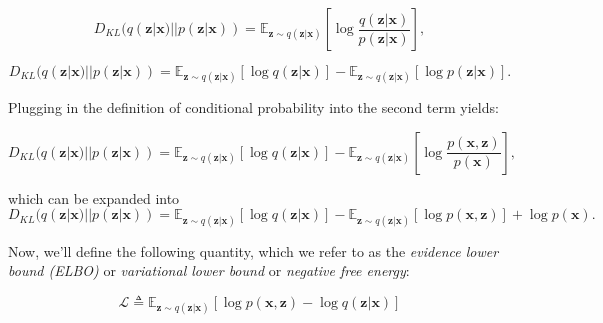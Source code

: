  \begin{equation}
 	D_{KL}(q (\mathbf{z} | \mathbf{x}) || p (\mathbf{z} | \mathbf{x})) = \mathbb{E}_{\mathbf{z} \sim q (\mathbf{z} | \mathbf{x})} \left[ \log \frac{q (\mathbf{z} | \mathbf{x})}{p (\mathbf{z} | \mathbf{x})} \right],
	\label{eq: elbo derivation 1}
 \end{equation}
 
 
 \begin{equation}
 	D_{KL}(q (\mathbf{z} | \mathbf{x}) || p (\mathbf{z} | \mathbf{x})) = \mathbb{E}_{\mathbf{z} \sim q (\mathbf{z} | \mathbf{x})} \left[ \log q (\mathbf{z} | \mathbf{x}) \right] - \mathbb{E}_{\mathbf{z} \sim q (\mathbf{z} | \mathbf{x})} \left[ \log p (\mathbf{z} | \mathbf{x}) \right].
	\label{eq: elbo derivation 2}
 \end{equation}
 
 \noindent Plugging in the definition of conditional probability into the second term yields:
 
  \begin{equation}
 	D_{KL}(q (\mathbf{z} | \mathbf{x}) || p (\mathbf{z} | \mathbf{x})) = \mathbb{E}_{\mathbf{z} \sim q (\mathbf{z} | \mathbf{x})} \left[ \log q (\mathbf{z} | \mathbf{x}) \right] - \mathbb{E}_{\mathbf{z} \sim q (\mathbf{z} | \mathbf{x})} \left[ \log \frac{p (\mathbf{x}, \mathbf{z})}{p (\mathbf{x})} \right],
	\label{eq: elbo derivation 3}
 \end{equation}
 
 \noindent which can be expanded into
 \begin{equation}
 	D_{KL}(q (\mathbf{z} | \mathbf{x}) || p (\mathbf{z} | \mathbf{x})) = \mathbb{E}_{\mathbf{z} \sim q (\mathbf{z} | \mathbf{x})} \left[ \log q (\mathbf{z} | \mathbf{x}) \right] - \mathbb{E}_{\mathbf{z} \sim q (\mathbf{z} | \mathbf{x})} \left[ \log p (\mathbf{x}, \mathbf{z}) \right] + \log p (\mathbf{x}).
	\label{eq: elbo derivation 4}
 \end{equation}
 
 \noindent Now, we'll define the following quantity, which we refer to as the \textit{evidence lower bound (ELBO)} or \textit{variational lower bound} or \textit{negative free energy}:
 
\begin{equation}
 	\boxed{\mathcal{L} \triangleq \mathbb{E}_{\mathbf{z} \sim q (\mathbf{z} | \mathbf{x})} \left[ \log p (\mathbf{x}, \mathbf{z}) - \log q (\mathbf{z} | \mathbf{x}) \right]}
	\label{eq: elbo derivation 5}
\end{equation}

